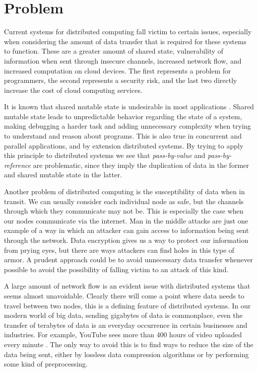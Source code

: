 
\chapter{Problem}
\label{cha:Problem}

Current systems for distributed computing fall victim to certain issues, especially when considering the amount of data transfer that is required for these systems to function. These are a greater amount of shared state, vulnerability of information when sent through insecure channels, increased network flow, and increased computation on cloud devices. The first represents a problem for programmers, the second represents a security risk, and the last two directly increase the cost of cloud computing services.

It is known that shared mutable state is undesirable in most applications \cite{alma991003995329707681}. Shared mutable state leads to unpredictable behavior regarding the state of a system, making debugging a harder task and adding unnecessary complexity when trying to understand and reason about programs. This is also true in concurrent and parallel applications, and by extension distributed systems. By trying to apply this principle to distributed systems we see that \textit{pass-by-value} and \textit{pass-by-reference} are problematic, since they imply the duplication of data in the former and shared mutable state in the latter. 

Another problem of distributed computing is the susceptibility of data when in transit. We can usually consider each individual node as safe, but the channels through which they communicate may not be. This is especially the case when our nodes communicate via the internet. Man in the middle attacks are just one example of a way in which an attacker can gain access to information being sent through the network. Data encryption gives us a way to protect our information from prying eyes, but there are ways attackers can find holes in this type of armor. A prudent approach could be to avoid unnecessary data transfer whenever possible to avoid the possibility of falling victim to an attack of this kind.

A large amount of network flow is an evident issue with distributed systems that seems almost unavoidable. Clearly there will come a point where data needs to travel between two nodes, this is a defining feature of distributed systems. In our modern world of big data, sending gigabytes of data is commonplace, even the transfer of terabytes of data is an everyday occurrence in certain businesses and industries. For example, YouTube sees more than 400 hours of video uploaded every minute \cite{KAFKA2015}. The only way to avoid this is to find ways to reduce the size of the data being sent, either by lossless data compression algorithms or by performing some kind of preprocessing. 

